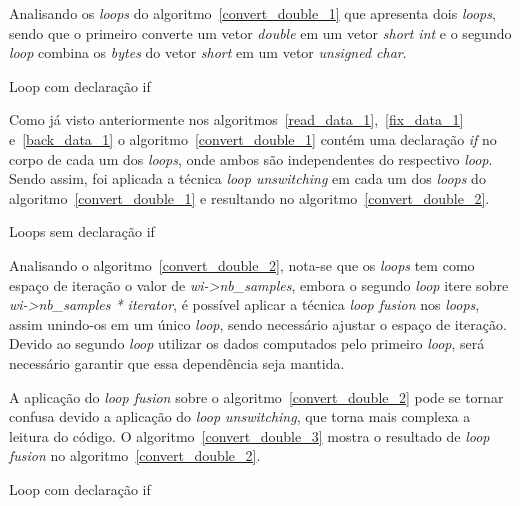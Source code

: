Analisando os \textit{loops} do  algoritmo~\ref{convert_double_1} que apresenta 
dois \textit{loops},
sendo que o primeiro converte um vetor \textit{double} em um vetor 
\textit{short int} e o segundo \textit{loop} combina os \textit{bytes} do vetor
\textit{short} em um vetor \textit{unsigned char}.

\begin{algorithm}
\caption{Loop com declaração if }
\label{convert_double_1}

\end{algorithm}


Como já visto anteriormente nos algoritmos~\ref{read_data_1},~\ref{fix_data_1} 
e~\ref{back_data_1} 
o algoritmo~\ref{convert_double_1} contém uma declaração \textit{if} no corpo de
cada um dos \textit{loops}, onde ambos são independentes do respectivo \textit{loop}. 
Sendo assim, foi aplicada a técnica \textit{loop unswitching} em cada um dos
\textit{loops} do algoritmo~\ref{convert_double_1} e resultando no
algoritmo~\ref{convert_double_2}.

\begin{algorithm}
\caption{Loops sem declaração if}
\label{convert_double_2}

\end{algorithm}



Analisando o algoritmo~\ref{convert_double_2}, nota-se que os 
\textit{loops} tem como
espaço de iteração o valor de \textit{wi->nb\_samples}, embora o segundo
\textit{loop} itere sobre \textit{wi->nb\_samples * iterator},  é possível aplicar
a técnica \textit{loop fusion} nos \textit{loops}, assim unindo-os em um
único \textit{loop}, sendo necessário ajustar o espaço de iteração. 
Devido ao
segundo \textit{loop} utilizar os dados computados pelo primeiro \textit{loop},
será necessário garantir que essa dependência seja mantida.

A aplicação do \textit{loop fusion} sobre o
algoritmo~\ref{convert_double_2} pode se tornar confusa devido a aplicação do
\textit{loop unswitching}, que torna mais complexa a leitura do código. O
algoritmo~\ref{convert_double_3} mostra o 
resultado de \textit{loop fusion} no algoritmo~\ref{convert_double_2}. 

\begin{algorithm}
\caption{Loop com declaração if }
\label{convert_double_3}

\end{algorithm}


